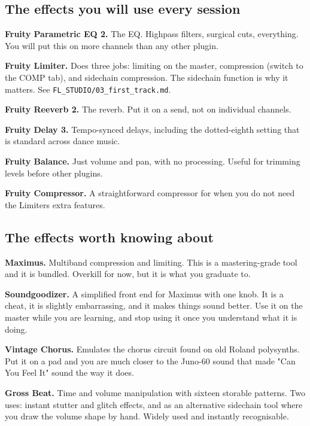 \subsection{The effects you will use every session}\label{fl05_plugins-the-effects-you-will-use-every-session}

\textbf{Fruity Parametric EQ 2.} The EQ. Highpass filters, surgical cuts, everything. You will
put this on more channels than any other plugin.

\textbf{Fruity Limiter.} Does three jobs: limiting on the master, compression (switch to the COMP
tab), and sidechain compression. The sidechain function is why it matters. See
\texttt{FL\_STUDIO/03\_first\_track.md}.

\textbf{Fruity Reeverb 2.} The reverb. Put it on a send, not on individual channels.

\textbf{Fruity Delay 3.} Tempo-synced delays, including the dotted-eighth setting that is standard
across dance music.

\textbf{Fruity Balance.} Just volume and pan, with no processing. Useful for trimming levels
before other plugins.

\textbf{Fruity Compressor.} A straightforward compressor for when you do not need the Limiter\textquotesingle s
extra features.

\subsection{The effects worth knowing about}\label{fl05_plugins-the-effects-worth-knowing-about}

\textbf{Maximus.} Multiband compression and limiting. This is a mastering-grade tool and it is
bundled. Overkill for now, but it is what you graduate to.

\textbf{Soundgoodizer.} A simplified front end for Maximus with one knob. It is a cheat, it is
slightly embarrassing, and it makes things sound better. Use it on the master while you are
learning, and stop using it once you understand what it is doing.

\textbf{Vintage Chorus.} Emulates the chorus circuit found on old Roland polysynths. Put it on a
pad and you are much closer to the Juno-60 sound that made "Can You Feel It" sound the way
it does.

\textbf{Gross Beat.} Time and volume manipulation with sixteen storable patterns. Two uses:
instant stutter and glitch effects, and as an alternative sidechain tool where you draw the
volume shape by hand. Widely used and instantly recognisable.

